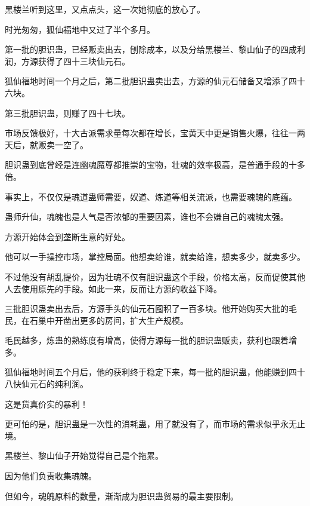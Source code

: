 \begin{this_body}
黑楼兰听到这里，又点点头，这一次她彻底的放心了。

时光匆匆，狐仙福地中又过了半个多月。

第一批的胆识蛊，已经贩卖出去，刨除成本，以及分给黑楼兰、黎山仙子的四成利润，方源获得了四十三块仙元石。

狐仙福地时间一个月之后，第二批胆识蛊卖出去，方源的仙元石储备又增添了四十六块。

第三批胆识蛊，则赚了四十七块。

市场反馈极好，十大古派需求量每次都在增长，宝黄天中更是销售火爆，往往一两天后，就贩卖一空了。

胆识蛊到底曾经是连幽魂魔尊都推崇的宝物，壮魂的效率极高，是普通手段的十多倍。

事实上，不仅仅是魂道蛊师需要，奴道、炼道等相关流派，也需要魂魄的底蕴。

蛊师升仙，魂魄也是人气是否浓郁的重要因素，谁也不会嫌自己的魂魄太强。

方源开始体会到垄断生意的好处。

他可以一手操控市场，掌控局面。他想卖给谁，就卖给谁，想卖多少，就卖多少。

不过他没有胡乱提价，因为壮魂不仅有胆识蛊这个手段，价格太高，反而促使其他人去使用原先的手段。如此一来，反而让方源的收益下降。

三批胆识蛊卖出去后，方源手头的仙元石囤积了一百多块。他开始购买大批的毛民，在石巢中开凿出更多的房间，扩大生产规模。

毛民越多，炼蛊的熟练度有增高，使得方源每一批的胆识蛊贩卖，获利也跟着增多。

狐仙福地时间五个月后，他的获利终于稳定下来，每一批的胆识蛊，他能赚到四十八快仙元石的纯利润。

这是货真价实的暴利！

更可怕的是，胆识蛊是一次性的消耗蛊，用了就没有了，而市场的需求似乎永无止境。

黑楼兰、黎山仙子开始觉得自己是个拖累。

因为他们负责收集魂魄。

但如今，魂魄原料的数量，渐渐成为胆识蛊贸易的最主要限制。

\end{this_body}

